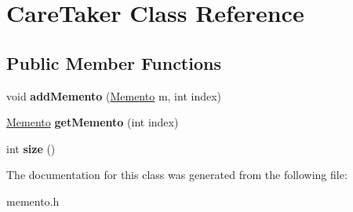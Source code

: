 \hypertarget{class_care_taker}{}\section{Care\+Taker Class Reference}
\label{class_care_taker}
\subsection*{Public Member Functions}
\begin{DoxyCompactItemize}
\item 
void {\bfseries add\+Memento} (\hyperlink{class_memento}{Memento} m, int index)\hypertarget{class_care_taker_af68e1bd6a333e599aadfc67868a67218}{}\label{class_care_taker_af68e1bd6a333e599aadfc67868a67218}

\item 
\hyperlink{class_memento}{Memento} {\bfseries get\+Memento} (int index)\hypertarget{class_care_taker_a61a5e9d7f1bc650b1b8cba22368fb32c}{}\label{class_care_taker_a61a5e9d7f1bc650b1b8cba22368fb32c}

\item 
int {\bfseries size} ()\hypertarget{class_care_taker_a0588647afc65bba97a7387b013122889}{}\label{class_care_taker_a0588647afc65bba97a7387b013122889}

\end{DoxyCompactItemize}


The documentation for this class was generated from the following file\+:\begin{DoxyCompactItemize}
\item 
memento.\+h\end{DoxyCompactItemize}
